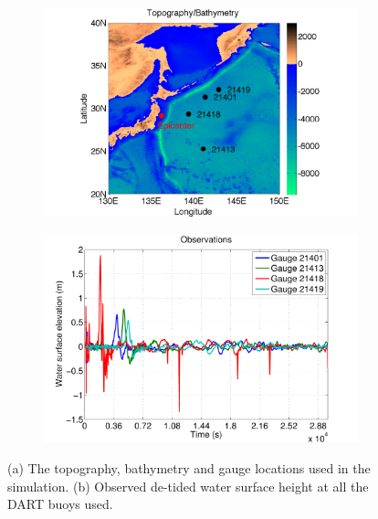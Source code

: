 \begin{figure}[ht]
\centering
\begin{subfigure}[c]{0.45\textwidth}
    \includegraphics[width=\textwidth]{./figures/topo.pdf}
    \caption{} \label{fig:setup_buoy_locations}
\end{subfigure}
\begin{subfigure}[c]{0.45\textwidth}
    \includegraphics[width=\textwidth]{./figures/obs.pdf} 
    \caption{} \label{fig:setup_buoy_data}
\end{subfigure}
\caption{(a) The topography, bathymetry and gauge locations used in the simulation. (b) Observed de-tided water surface height at all the DART buoys used.}
\label{fig:setup}
\end{figure}

